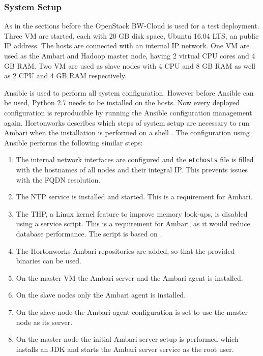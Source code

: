 \subsubsection{System Setup}

As in the sections before the OpenStack BW-Cloud is used for a test deployment.
Three \acs{VM} are started, each with 20 \ac{GB} disk space, Ubuntu 16.04 \ac{LTS}, an public \ac{IP} address. 
The hosts are connected with an internal \ac{IP} network.
One \ac{VM} are used as the Ambari and Hadoop master node, having 2 virtual \ac{CPU} cores and 4 \ac{GB} \ac{RAM}.
Two \acs{VM} are used as slave nodes with 4 \acs{CPU} and 8 \ac{GB} \ac{RAM} as well as 2 \acs{CPU} and 4 \ac{GB} \ac{RAM} respectively.

Ansible is used to perform all system configuration. 
However before Ansible can be used, Python 2.7 needs to be installed on the hosts.
Now every deployed configuration is reproducible by running the Ansible configuration management again.
Hortonworks describes which steps of system setup are necessary 
to run Ambari when the installation is performed on a shell \autocite[][]{hortonworks2018install}.
The configuration using Ansible  performs the following similar steps:
\begin{enumerate}
    \item The internal network interfaces are configured 
        and the \texttt{\/etc\/hosts} file is filled with the hostnames 
        of all nodes and their integral \acs{IP}. 
        This prevents issues with the \ac{FQDN} resolution.
    \item The \ac{NTP} service is installed and started. 
        This is a requirement for Ambari.
    \item The \ac{THP}, a Linux kernel feature to improve memory look-ups, 
        is disabled using a service script. 
        This is a requirement for Ambari, 
        as it would reduce database performance.
        The script is based on \autocite{braun2017hugepages}.
    \item The Hortonworks Ambari repositories are added, so that the provided     binaries can be used.
    \item On the master \ac{VM} the Ambari server 
        and the Ambari agent is installed.
    \item On the slave nodes only the Ambari agent is installed.
    \item On the slave node the Ambari agent configuration is set to use the
        master node as its server.
    \item On the master node the initial Ambari server setup is performed which
        installs an \ac{JDK} 
        and starts the Ambari server service as the root user.
\end{enumerate}

